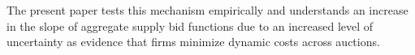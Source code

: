 The present paper tests this mechanism empirically and understands an increase in the slope of aggregate supply bid functions due to an increased level of uncertainty as evidence that firms minimize dynamic costs across auctions. %


%
%
%


%

